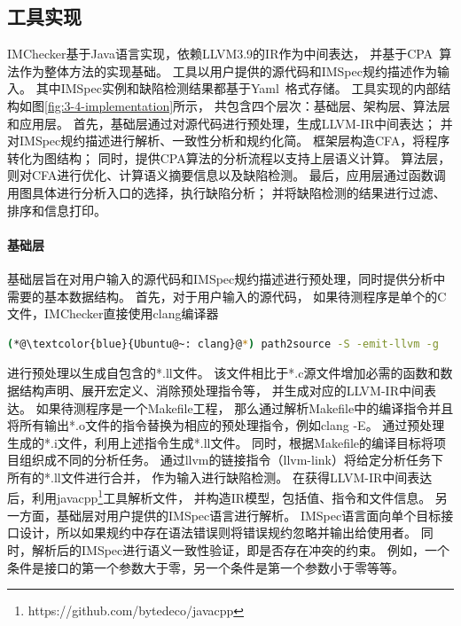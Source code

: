 \subsection{工具实现}
IMChecker基于Java语言实现，依赖LLVM3.9的IR作为中间表达，
并基于CPA~\cite{07-cav-cpachecker}算法作为整体方法的实现基础。
工具以用户提供的源代码和IMSpec规约描述作为输入。
其中IMSpec实例和缺陷检测结果都基于Yaml~\cite{yaml}格式存储。
工具实现的内部结构如图\ref{fig:3-4-implementation}所示，
共包含四个层次：基础层、架构层、算法层和应用层。
首先，基础层通过对源代码进行预处理，生成LLVM-IR中间表达；
并对IMSpec规约描述进行解析、一致性分析和规约化简。
框架层构造CFA，将程序转化为图结构；
同时，提供CPA算法的分析流程以支持上层语义计算。
算法层，则对CFA进行优化、计算语义摘要信息以及缺陷检测。
最后，应用层通过函数调用图具体进行分析入口的选择，执行缺陷分析；
并将缺陷检测的结果进行过滤、排序和信息打印。

\paragraph{基础层}
基础层旨在对用户输入的源代码和IMSpec规约描述进行预处理，同时提供分析中需要的基本数据结构。
首先，对于用户输入的源代码，
如果待测程序是单个的C文件，IMChecker直接使用clang编译器
\begin{lstlisting}[language={bash},
basicstyle=\linespread{0.8}\listingsfont,
numbers=none,
xleftmargin=.25\textwidth]
(*@\textcolor{blue}{Ubuntu@~: clang}@*) path2source -S -emit-llvm -g
\end{lstlisting}
进行预处理以生成自包含的*.ll文件。
该文件相比于*.c源文件增加必需的函数和数据结构声明、展开宏定义、消除预处理指令等，
并生成对应的LLVM-IR中间表达。
如果待测程序是一个Makefile工程，
那么通过解析Makefile中的编译指令并且将所有输出*.o文件的指令替换为相应的预处理指令，例如clang -E。
通过预处理生成的*.i文件，利用上述指令生成*.ll文件。
同时，根据Makefile的编译目标将项目组织成不同的分析任务。
通过llvm的链接指令（llvm-link）将给定分析任务下所有的*.ll文件进行合并，
作为输入进行缺陷检测。
在获得LLVM-IR中间表达后，利用javacpp\footnote{https://github.com/bytedeco/javacpp}工具解析文件，
并构造IR模型，包括值、指令和文件信息。
另一方面，基础层对用户提供的IMSpec语言进行解析。
IMSpec语言面向单个目标接口设计，所以如果规约中存在语法错误则将错误规约忽略并输出给使用者。
同时，解析后的IMSpec进行语义一致性验证，即是否存在冲突的约束。
例如，一个条件是接口的第一个参数大于零，另一个条件是第一个参数小于零等等。

